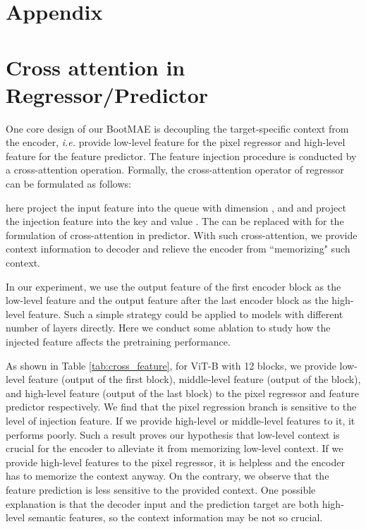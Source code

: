 \documentclass[runningheads]{llncs}
\begin{document}
\clearpage



\newpage
\section*{Appendix }
\appendix
\section{Cross attention in Regressor/Predictor }
One core design of our BootMAE is decoupling the target-specific context from the encoder, 
\emph{i.e.} provide low-level feature for the pixel regressor and high-level feature for the feature predictor. The feature injection procedure is conducted by a cross-attention operation. Formally, the cross-attention operator of regressor can be formulated as follows:


here  project the input feature  into the queue  with dimension , and  and   project the injection feature  into the key  and value . The  can be replaced with  for the formulation of cross-attention in predictor.
With such cross-attention, we provide context information to decoder and relieve the encoder from ``memorizing" such context.

In our experiment, we use the output feature of the first encoder block as the low-level feature and the output feature after the last encoder block as the high-level feature. Such a simple strategy could be applied to models with different number of layers directly. Here we conduct some ablation to study how the injected feature affects the pretraining performance. 

As shown in Table \ref{tab:cross_feature}, for ViT-B with 12 blocks, we provide low-level feature (output of the first block), middle-level feature (output of the  block), and high-level feature (output of the last block) to the pixel regressor and feature predictor respectively. We find that the pixel regression branch is sensitive to the level of injection feature. If we provide high-level or middle-level features to it, it performs poorly. Such a result proves our hypothesis that low-level context is crucial for the encoder to alleviate it from memorizing low-level context. If we provide high-level features to the pixel regressor, it is helpless and the encoder has to memorize the context anyway. On the contrary, we observe that the feature prediction is less sensitive to the provided context. One possible explanation is that the decoder input  and the prediction target are both high-level semantic features, so the context information may be not so crucial. 
\end{document}
